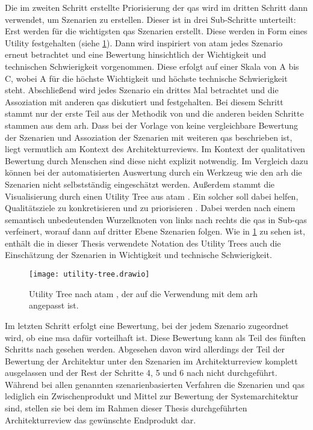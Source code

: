 Die im zweiten Schritt erstellte Priorisierung der \glspl{qa} wird im dritten Schritt dann verwendet, um Szenarien zu erstellen.
Dieser ist in drei Sub-Schritte unterteilt:
Erst werden für die wichtigsten \glspl{qa} Szenarien erstellt.
Diese werden in Form eines Utility festgehalten (siehe \cref{fig:utility-tree}).
Dann wird inspiriert von \gls{atam} \cite{kazman_2000} jedes Szenario erneut betrachtet und eine Bewertung hinsichtlich der Wichtigkeit und technischen Schwierigkeit vorgenommen.
Diese erfolgt auf einer Skala von A bis C, wobei A für die höchste Wichtigkeit und höchste technische Schwierigkeit steht.
Abschließend wird jedes Szenario ein drittes Mal betrachtet und die Assoziation mit anderen \glspl{qa} diskutiert und festgehalten.
Bei diesem Schritt stammt nur der erste Teil aus der Methodik von  und die anderen beiden Schritte stammen aus dem \gls{arh}.
Dass bei der Vorlage von  keine vergleichbare Bewertung der Szenarien und Assoziation der Szenarien mit weiteren \glspl{qa} beschrieben ist, liegt vermutlich am Kontext des Architekturreviews.
Im Kontext der qualitativen Bewertung durch Menschen sind diese nicht explizit notwendig.
Im Vergleich dazu können bei der automatisierten Auswertung durch ein Werkzeug wie den \gls{arh} die Szenarien nicht selbstständig eingeschätzt werden.
Außerdem stammt die Visualisierung durch einen Utility Tree aus \gls{atam} \cite{kazman_2000}.
Ein solcher soll dabei helfen, Qualitätsziele zu konkretisieren und zu priorisieren \cite{kazman_2000}.
Dabei werden nach einem semantisch unbedeutenden Wurzelknoten von links nach rechts die \glspl{qa} in Sub-\glspl{qa} verfeinert, worauf dann auf dritter Ebene Szenarien folgen.
Wie in \cref{fig:utility-tree} zu sehen ist, enthält die in dieser Thesis verwendete Notation des Utility Trees auch die Einschätzung der Szenarien in Wichtigkeit und technische Schwierigkeit.
\begin{figure}[!h]
	\centering
	\texttt{[image: utility-tree.drawio]}
	\caption[Utility Tree nach \acrshort{atam}]{
		Utility Tree nach \gls{atam} \cite{kazman_2000}, der auf die Verwendung mit dem \gls{arh} angepasst ist.
	}
	\label{fig:utility-tree}
\end{figure}


Im letzten Schritt erfolgt eine Bewertung, bei der jedem Szenario zugeordnet wird, ob eine \gls{msa} dafür vorteilhaft ist.
Diese Bewertung kann als Teil des fünften Schritts nach  gesehen werden.
Abgesehen davon wird allerdings der Teil der Bewertung der Architektur unter den Szenarien im Architekturreview komplett ausgelassen und der Rest der Schritte 4, 5 und 6 nach  nicht durchgeführt.
Während bei allen genannten szenarienbasierten Verfahren die Szenarien und \glspl{qa} lediglich ein Zwischenprodukt und Mittel zur Bewertung der Systemarchitektur sind, stellen sie bei dem im Rahmen dieser Thesis durchgeführten Architekturreview das gewünschte Endprodukt dar.

